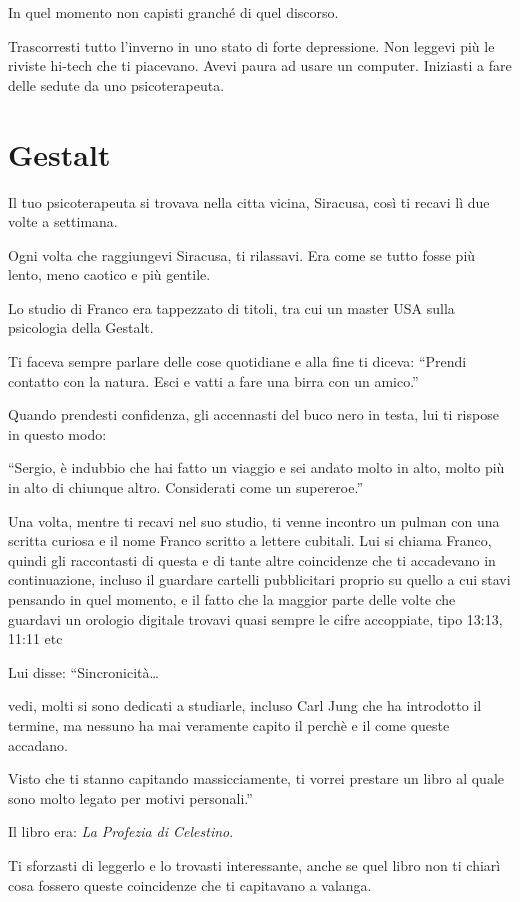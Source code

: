 In quel momento non capisti granché di quel discorso.

Trascorresti tutto l'inverno in uno stato di forte depressione. Non leggevi più le riviste hi-tech che ti piacevano. Avevi paura ad usare un computer. Iniziasti a fare delle sedute da uno psicoterapeuta.

\section{Gestalt}
\label{gestalt}

Il tuo psicoterapeuta si trovava nella citta vicina, Siracusa, così ti recavi lì due volte a settimana.

Ogni volta che raggiungevi Siracusa, ti rilassavi. Era come se tutto fosse più lento, meno caotico e più gentile.

Lo studio di Franco era tappezzato di titoli, tra cui un master USA sulla psicologia della Gestalt.

Ti faceva sempre parlare delle cose quotidiane e alla fine ti diceva: “Prendi contatto con la natura. Esci e vatti a fare una birra con un amico.”

Quando prendesti confidenza, gli accennasti del buco nero in testa, lui ti rispose in questo modo:

“Sergio, è indubbio che hai fatto un viaggio e sei andato molto in alto, molto più in alto di chiunque altro. Considerati come un supereroe.”

Una volta, mentre ti recavi nel suo studio, ti venne incontro un pulman con una scritta curiosa e il nome Franco scritto a lettere cubitali. Lui si chiama Franco, quindi gli raccontasti di questa e di tante altre coincidenze che ti accadevano in continuazione, incluso il guardare cartelli pubblicitari proprio su quello a cui stavi pensando in quel momento, e il fatto che la maggior parte delle volte che guardavi un orologio digitale trovavi quasi sempre le cifre accoppiate, tipo 13:13, 11:11 etc

Lui disse: “Sincronicità\ldots

vedi, molti si sono dedicati a studiarle, incluso Carl Jung che ha introdotto il termine, ma nessuno ha mai veramente capito il perchè e il come queste accadano.

Visto che ti stanno capitando massicciamente, ti vorrei prestare un libro al quale sono molto legato per motivi personali.”

Il libro era: \textit{La Profezia di Celestino}.

Ti sforzasti di leggerlo e lo trovasti interessante, anche se quel libro non ti chiarì cosa fossero queste coincidenze che ti capitavano a valanga.

